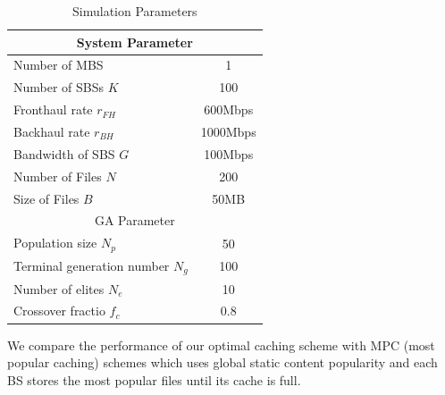 \documentclass[conference]{IEEEtran}
\begin{document}
\begin{table}[htbp]
 \caption{Simulation Parameters}
 \setlength{\tabcolsep}{7mm}
 \begin{center}
  \begin{tabular}{|l|c|}
   \hline
   \multicolumn{2}{|c|}{System Parameter}                \\\hline
   Number of MBS                  & 1                 \\ \hline
   Number of SBSs $K$             & 100                \\\hline
   Fronthaul rate $r_{FH}$        & 600Mbps               \\ \hline
   Backhaul rate $r_{BH}$         & 1000Mbps               \\\hline
   Bandwidth of SBS $G$           &  100Mbps              \\\hline
   Number of Files $N$            & 200               \\\hline
   Size of Files $B$              & 50MB            \\\hline
   \multicolumn{2}{|c|}{GA Parameter}                \\\hline
   Population size $N_p$          & 50              \\\hline
   Terminal generation number $N_g$ & 100               \\\hline
   Number of elites $N_e$         & 10              \\\hline
   Crossover fractio $f_c$        & 0.8            \\\hline
  \end{tabular}
  \label{tab1}
 \end{center}
\end{table}

We compare the performance of our optimal caching scheme with MPC (most popular caching) schemes which uses global static content popularity and each BS stores the most popular files until its cache is full\cite{6600983}.
\end{document}
